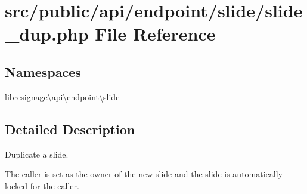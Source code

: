 \hypertarget{src_2public_2api_2endpoint_2slide_2slide__dup_8php}{}\section{src/public/api/endpoint/slide/slide\+\_\+dup.php File Reference}
\label{src_2public_2api_2endpoint_2slide_2slide__dup_8php}
\subsection*{Namespaces}
\begin{DoxyCompactItemize}
\item 
 \hyperlink{namespacelibresignage_1_1api_1_1endpoint_1_1slide}{libresignage\textbackslash{}api\textbackslash{}endpoint\textbackslash{}slide}
\end{DoxyCompactItemize}


\subsection{Detailed Description}
Duplicate a slide.

The caller is set as the owner of the new slide and the slide is automatically locked for the caller.

